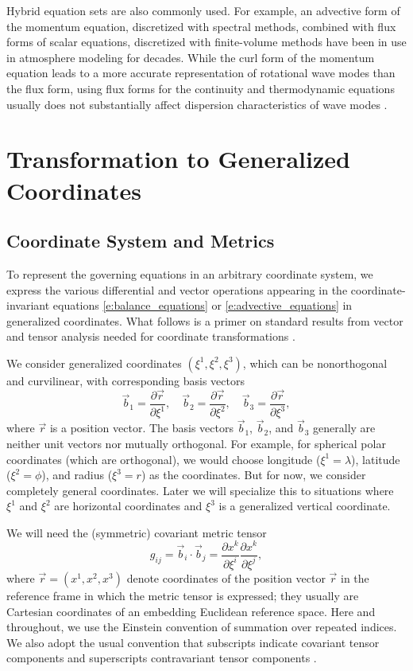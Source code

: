 \documentclass{report}
\begin{document}
Hybrid equation sets are also commonly used. For example, an advective form of the momentum equation, discretized with spectral methods, combined with flux forms of scalar equations, discretized with finite-volume methods have been in use in atmosphere modeling for decades. While the curl form of the momentum equation leads to a more accurate representation of rotational wave modes than the flux form, using flux forms for the continuity and thermodynamic equations usually does not substantially affect dispersion characteristics of wave modes \citep{Thuburn05n}.

\section{Transformation to Generalized Coordinates}

\subsection{Coordinate System and Metrics}

To represent the governing equations in an arbitrary coordinate system, we express the various differential and vector operations appearing in the coordinate-invariant equations \eqref{e:balance_equations} or \eqref{e:advective_equations} in generalized coordinates. What follows is a  primer on standard results from vector and tensor analysis needed for coordinate transformations \citep[see, e.g.,][chapter~4]{Arfken13}.

We consider generalized coordinates $(\xi^1, \xi^2, \xi^3)$, which can be nonorthogonal and curvilinear, with corresponding basis vectors 
\begin{equation}
\vec{b}_1 = \frac{\partial \vec{r}}{\partial \xi^1}, \quad \vec{b}_2 = \frac{\partial \vec{r}}{\partial \xi^2}, \quad\vec{b}_3 = \frac{\partial \vec{r}}{\partial \xi^3},
\end{equation}
where $\vec{r}$ is a position vector. The basis vectors $\vec{b}_1$, $\vec{b}_2$, and $\vec{b}_3$ generally are neither unit vectors nor mutually orthogonal. For example, for spherical polar coordinates (which are orthogonal), we would choose longitude ($\xi^1 = \lambda$), latitude ($\xi^2 = \phi$), and radius ($\xi^3 = r$) as the coordinates. But for now, we consider completely general coordinates. Later we will specialize this to situations where $\xi^1$ and $\xi^2$ are horizontal coordinates and $\xi^3$ is a generalized vertical coordinate.

We will need the (symmetric) covariant metric tensor
\begin{equation}
    g_{ij} = \vec{b}_i \cdot \vec{b}_j = \frac{\partial x^k}{\partial\xi^i} \frac{\partial x^k}{\partial \xi^j},
\end{equation} 
where $\vec{r} = (x^1, x^2, x^3)$ denote coordinates of the position vector $\vec{r}$ in the reference frame in which the metric tensor is expressed; they usually are Cartesian coordinates of an embedding Euclidean reference space. Here and throughout, we use the Einstein convention of summation over repeated indices. We also  adopt the usual convention that subscripts indicate covariant tensor components and superscripts contravariant tensor components \citep[e.g.,][]{Arfken13}. 
\end{document}
